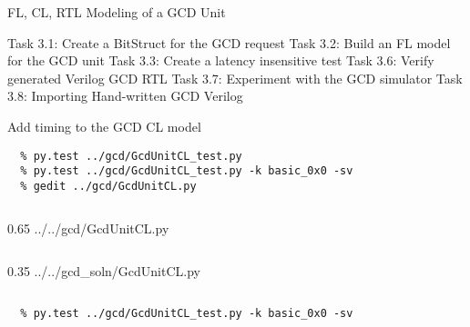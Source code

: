 
\begin{frame}{ FL, CL, RTL Modeling of a GCD Unit}
\begin{cbxlist}
  \1 Task 3.1: Create a BitStruct for the GCD request
  \1 Task 3.2: Build an FL model for the GCD unit
  \1 Task 3.3: Create a latency insensitive test
  \1 
  \1 
  \1 Task 3.6: Verify generated Verilog GCD RTL
  \1 Task 3.7: Experiment with the GCD simulator
  \1 Task 3.8: Importing Hand-written GCD Verilog
\end{cbxlist}
\end{frame}

\begin{task}\begin{frame}[fragile]{Add timing to the GCD CL model}

\vspace{-0.15in}
\begin{Verbatim}[commandchars=\\\{\}]
  % cd \midtilde/pymtl-tut/build
  % py.test ../gcd/GcdUnitCL_test.py
  % py.test ../gcd/GcdUnitCL_test.py -k basic_0x0 -sv
  % gedit ../gcd/GcdUnitCL.py
\end{Verbatim}
\vspace{-0.1in}

  \begin{cbxcols}
  \begin{column}{0.65\tw}
%
{../../gcd/GcdUnitCL.py}
  \end{column}
  \begin{column}{0.35\tw}
%
{../../gcd_soln/GcdUnitCL.py}
  \end{column}
  \end{cbxcols}

\vspace{-.2in}
\begin{verbatim}
  % py.test ../gcd/GcdUnitCL_test.py -k basic_0x0 -sv
\end{verbatim}
\end{frame}
\end{task}

